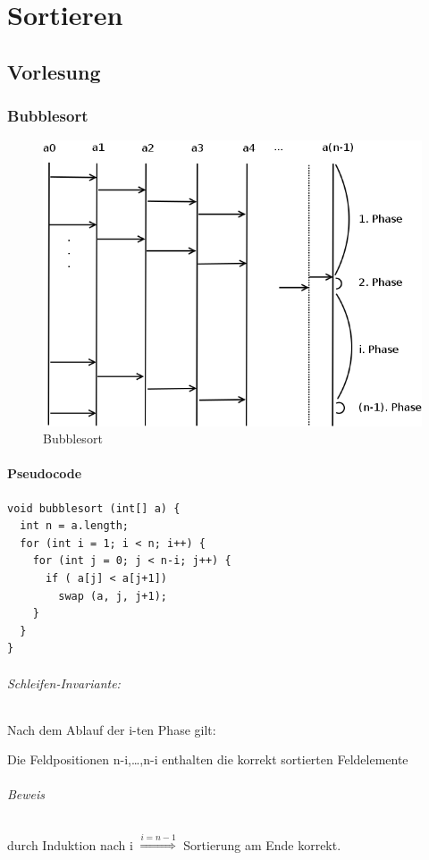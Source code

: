 \part{Sortieren}
\chapter{Vorlesung}
\section{Bubblesort}


\begin{figure}[H]
\begin{center}
\includegraphics[width=0.8\linewidth]{1/Grafik/Bubblesort.png}
\caption{Bubblesort}
\end{center}
\end{figure}


\subsection{Pseudocode}
\begin{lstlisting}
void bubblesort (int[] a) {
  int n = a.length;
  for (int i = 1; i < n; i++) {
    for (int j = 0; j < n-i; j++) {
      if ( a[j] < a[j+1])
        swap (a, j, j+1);
    }
  }
}
\end{lstlisting}
\paragraph{Schleifen-Invariante:} Nach dem Ablauf der i-ten Phase gilt:
\begin{center}
	Die Feldpositionen n-i,\ldots,n-i enthalten die korrekt sortierten Feldelemente
\end{center}
\paragraph{Beweis} durch Induktion nach i $\overset{i=n-1}{\Longrightarrow}$ Sortierung am Ende korrekt.


